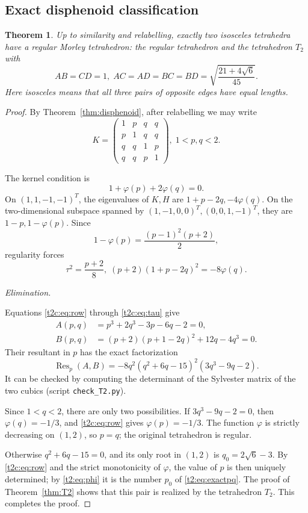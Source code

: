 \documentclass[11pt]{article}
\newtheorem{theorem}{Theorem}[section]
\theoremstyle{definition}
\theoremstyle{remark}
\DeclareMathOperator{\Res}{Res}
\newcommand{\ph}{\varphi}
\begin{document}
\subsection{Exact disphenoid classification}
\begin{theorem}\label{t2:thm:classification}
Up to similarity and relabelling, exactly two isosceles tetrahedra have
a regular Morley tetrahedron: the regular tetrahedron and the tetrahedron
$T_2$ with
\[
 AB=CD=1,\;
 AC=AD=BC=BD=\sqrt{\frac{21+4\sqrt6}{45}}.
\]
Here \emph{isosceles} means that all three pairs of opposite edges
have equal lengths.
\end{theorem}
\begin{proof}
By Theorem~\ref{thm:disphenoid}, after relabelling we may write
\begin{equation}\label{t2c:eq:K}
 K=\begin{pmatrix}
 1&p&q&q\\p&1&q&q\\q&q&1&p\\q&q&p&1
 \end{pmatrix},\; 1<p,q<2.
\end{equation}

The kernel condition is
\begin{equation}\label{t2c:eq:row}
 1+\ph(p)+2\ph(q)=0.
\end{equation}
On $(1,1,-1,-1)^T$, the eigenvalues of $K,H$ are
$1+p-2q,-4\ph(q)$. On the two-dimensional subspace spanned by
$(1,-1,0,0)^T,(0,0,1,-1)^T$, they are $1-p,1-\ph(p)$.
Since
\[
 1-\ph(p)=\frac{(p-1)^2(p+2)}2,
\]
regularity forces
\begin{equation}\label{t2c:eq:tau}
 \tau^2=\frac{p+2}{8},\;
 (p+2)(1+p-2q)^2=-8\ph(q).
\end{equation}

\medskip\noindent\emph{Elimination.}

Equations \eqref{t2c:eq:row} through \eqref{t2c:eq:tau} give
\begin{align*}
 A(p,q)&=p^3+2q^3-3p-6q-2=0,\\
 B(p,q)&=(p+2)(p+1-2q)^2+12q-4q^3=0.
\end{align*}
Their resultant in $p$ has the exact factorization
\begin{equation}\label{t2:eq:resultant}
 \Res_p(A,B)
 =-8q^2(q^2+6q-15)^2(3q^3-9q-2).
\end{equation}
It can be checked by computing the determinant of the Sylvester
matrix of the two cubics (script \texttt{check\_T2.py}).

Since $1<q<2$, there are only two possibilities.
If $3q^3-9q-2=0$, then $\ph(q)=-1/3$, and
\eqref{t2c:eq:row} gives $\ph(p)=-1/3$. The function $\ph$ is strictly
decreasing on $(1,2)$, so $p=q$; the original tetrahedron is regular.

Otherwise $q^2+6q-15=0$, and its only root in $(1,2)$ is $q_0=2\sqrt6-3$.
By \eqref{t2c:eq:row} and the strict monotonicity of $\ph$, the value
of $p$ is then uniquely determined; by \eqref{t2:eq:phi} it is the
number $p_0$ of \eqref{t2:eq:exactpq}. The proof of
Theorem~\ref{thm:T2} shows that this pair is realized by the
tetrahedron $T_2$. This completes the proof.
\end{proof}
\end{document}
